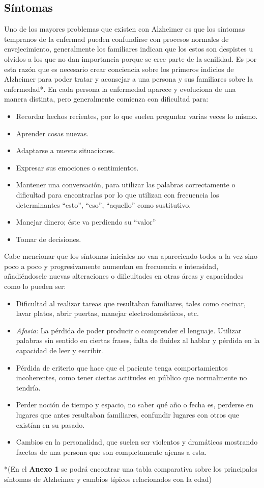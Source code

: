 \documentclass[smallextended, 12pt]{article}
\begin{document}
	\subsection{S\'intomas}
	Uno de los mayores problemas que existen con Alzheimer es que los s\'intomas tempranos de la enfermad pueden confundirse con procesos normales de envejecimiento, generalmente los familiares indican que los estos son despistes u olvidos a los que no dan importancia porque se cree parte de la senilidad. Es por esta raz\'on que es necesario crear conciencia sobre los primeros indicios de Alzheimer para poder tratar y aconsejar a una persona y sus familiares sobre la enfermedad*. En cada persona la enfermedad aparece y evoluciona de una manera distinta, pero generalmente comienza con dificultad para: \cite{ref4} \cite{ref3}
	\begin{itemize}
		\item Recordar hechos recientes, por lo que suelen preguntar varias veces lo mismo.
		\item Aprender cosas nuevas. 
		\item Adaptarse a nuevas situaciones.
		\item Expresar sus emociones o sentimientos.
		\item Mantener una conversaci\'on, para utilizar las palabras correctamente o dificultad para encontrarlas por lo que utilizan con frecuencia los determinantes ``esto'', ``eso'', ``aquello'' como sustitutivo.
		\item Manejar dinero; \'este va perdiendo su ``valor'' 
		\item Tomar de decisiones. \cite{ref3}
	\end{itemize} 
	Cabe mencionar que los s\'intomas iniciales no van apareciendo todos a la vez sino poco a poco y progresivamente aumentan en frecuencia e intensidad, a\~nadi\'endosele nuevas alteraciones o dificultades en otras \'areas y capacidades como lo pueden ser: \cite{ref3}
	\begin{itemize}
		\item  Dificultad al realizar tareas que resultaban familiares, tales como cocinar, lavar platos, abrir puertas, manejar electrodom\'esticos, etc.
		\item \textit{Afasia:} La p\'erdida de poder producir o comprender el lenguaje. Utilizar palabras sin sentido en ciertas frases, falta de fluidez al hablar y p\'erdida en la capacidad de leer y escribir.
		\item P\'erdida de criterio que hace que el paciente tenga comportamientos incoherentes, como tener ciertas actitudes en p\'ublico que normalmente no tendr\'ia. 
		\item  Perder noci\'on de tiempo y espacio, no saber qu\'e a\~no o fecha es, perderse en lugares que antes resultaban familiares, confundir lugares con otros que exist\'ian en su pasado. 
		\item 	Cambios en la personalidad, que suelen ser violentos y dram\'aticos mostrando facetas de una persona que son completamente ajenas a esta. \cite{ref4}
	\end{itemize} 
	*(En el \textbf{Anexo 1} se podr\'a encontrar una tabla comparativa sobre los principales s\'intomas de Alzheimer y cambios t\'ipicos relacionados con la edad) \cite{ref7}
	
\end{document}
